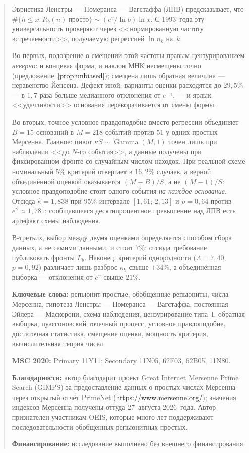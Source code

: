 \documentclass[11pt,a4paper]{article}
\theoremstyle{plain}
\theoremstyle{remark}
\newcommand{\Rb}{R_b}
\newcommand{\eg}{e^{\gamma}}
\newcommand{\emg}{e^{-\gamma}}
\DeclareMathOperator{\Gam}{Gamma}
\begin{document}
\begin{abstract}
Эвристика Ленстры --- Померанса --- Вагстаффа (ЛПВ) предсказывает, что
$\#\{n\le x:\Rb(n)\ \text{просто}\}\sim(\eg/\ln b)\ln x$. С 1993~года эту универсальность проверяют через
<<нормированную частоту встречаемости>>, получаемую регрессией $\ln n_k$ на~$k$.

Во-первых, подозрение о смещении этой частоты правым цензурированием
\emph{неверно}: и концевая форма, и наклон МНК несмещены точно
(предложение~\ref{prop:unbiased}); смещена лишь обратная величина --- неравенство
Йенсена. Дефект иной: варианты оценки расходятся до $29{,}5\%$ --- в $1{,}7$ раза
больше медианного отклонения от $\emg$, --- и ярлык <<удачливости>> основания
переворачивается от смены формы.

Во-вторых, точное условное правдоподобие вместо регрессии объединяет $B=15$
оснований в $M=218$ событий против $51$ у одних простых Мерсенна. Главное: пивот
$\kappa S\sim\Gam(M,1)$ точен лишь при наблюдении <<до $N$-го события>>, а данные
получены при фиксированном фронте со случайным числом находок. При реальной схеме номинальный $5\%$
критерий отвергает в $16{,}2\%$ случаев, а верной объединённой оценкой оказывается
$(M-B)/S$, а не $(M-1)/S$: условное правдоподобие стоит одного события \emph{на
каждое основание}. Отсюда $\hat\kappa=1{,}838$ при $95\%$ интервале
$[1{,}61;\,2{,}13]$ и $p=0{,}64$ против $\eg\approx1{,}781$; сообщавшееся
десятипроцентное превышение над ЛПВ есть артефакт схемы наблюдения.

В-третьих, выбор между двумя оценками определяется способом сбора данных, а не
самими данными, и стоит $7\%$; отсюда требование публиковать фронты $L_b$.
Наконец, критерий однородности ($\Lambda=7{,}40$, $p=0{,}92$) различает лишь
разброс $\kappa_b$ свыше $\pm34\%$, а объединённая выборка --- отклонения от
$\eg$ свыше $21\%$.

\medskip
\noindent\textbf{Ключевые слова:} репьюнит-простые, обобщённые репьюниты,
числа Мерсенна, гипотеза Ленстры --- Померанса --- Вагстаффа, постоянная
Эйлера --- Маскерони, схема наблюдения, цензурирование типа~I, обратная
выборка, пуассоновский точечный процесс, условное правдоподобие, достаточная
статистика, смещение оценки, мощность критерия, вычислительная теория чисел

\medskip
\noindent\textbf{MSC 2020:} Primary 11Y11; Secondary 11N05, 62F03, 62B05, 11N80.

\medskip
\noindent\textbf{Благодарности:} автор благодарит проект Great Internet Mersenne
Prime Search (GIMPS) за предоставление данных о простых числах Мерсенна через
открытый отчёт PrimeNet (\url{https://www.mersenne.org/}); значения индексов
Мерсенна получены оттуда 27~августа 2026~года. Автор признателен участникам
OEIS, которые много лет поддерживают последовательности обобщённых репьюнитных
простых.

\medskip
\noindent\textbf{Финансирование:} исследование выполнено без внешнего
финансирования.
\end{abstract}
\end{document}
